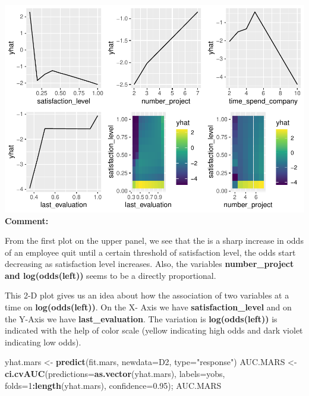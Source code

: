 \documentclass[
  11pt,
]{article}
\newenvironment{Shaded}{\begin{snugshade}}{\end{snugshade}}
\newcommand{\AttributeTok}[1]{\textcolor[rgb]{0.13,0.29,0.53}{#1}}
\newcommand{\DecValTok}[1]{\textcolor[rgb]{0.00,0.00,0.81}{#1}}
\newcommand{\FloatTok}[1]{\textcolor[rgb]{0.00,0.00,0.81}{#1}}
\newcommand{\FunctionTok}[1]{\textcolor[rgb]{0.13,0.29,0.53}{\textbf{#1}}}
\newcommand{\NormalTok}[1]{#1}
\newcommand{\OtherTok}[1]{\textcolor[rgb]{0.56,0.35,0.01}{#1}}
\newcommand{\SpecialCharTok}[1]{\textcolor[rgb]{0.81,0.36,0.00}{\textbf{#1}}}
\newcommand{\StringTok}[1]{\textcolor[rgb]{0.31,0.60,0.02}{#1}}
\begin{document}
\includegraphics[width=0.9\linewidth]{OWUSU_project_files/figure-latex/unnamed-chunk-42-1}\\
\textbf{Comment:}

From the first plot on the upper panel, we see that the is a sharp
increase in odds of an employee quit until a certain threshold of
satisfaction level, the odds start decreasing as satisfaction level
increases. Also, the variables \textbf{number\_project and
log(odds(left))} seems to be a directly proportional.

This 2-D plot gives us an idea about how the association of two
variables at a time on \textbf{log(odds(left))}. On the X- Axis we have
\textbf{satisfaction\_level} and on the Y-Axis we have
\textbf{last\_evaluation}. The variation is \textbf{log(odds(left))} is
indicated with the help of color scale (yellow indicating high odds and
dark violet indicating low odds).\\

\begin{Shaded}
\begin{Highlighting}[]
\NormalTok{yhat.mars }\OtherTok{\textless{}{-}} \FunctionTok{predict}\NormalTok{(fit.mars, }\AttributeTok{newdata=}\NormalTok{D2, }\AttributeTok{type=}\StringTok{"response"}\NormalTok{)}
\NormalTok{AUC.MARS }\OtherTok{\textless{}{-}} \FunctionTok{ci.cvAUC}\NormalTok{(}\AttributeTok{predictions=}\FunctionTok{as.vector}\NormalTok{(yhat.mars), }\AttributeTok{labels=}\NormalTok{yobs, }\AttributeTok{folds=}\DecValTok{1}\SpecialCharTok{:}\FunctionTok{length}\NormalTok{(yhat.mars), }\AttributeTok{confidence=}\FloatTok{0.95}\NormalTok{); AUC.MARS }
\end{Highlighting}
\end{Shaded}
\end{document}
